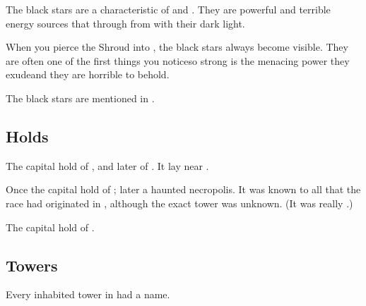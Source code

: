 The black stars are a characteristic of \Nyx{} and \Erebos. They are powerful and terrible energy sources that  through from \Erebos{} with their dark light. 

When you pierce the Shroud into \Nyx, the black stars always become visible. They are often one of the first things you notice\dash so strong is the menacing power they exude\dash and they are horrible to behold. 

The black stars are mentioned in \emph{}. 








\subsection{Holds}





\begin{gloss}



  \gitem{\Cathedon}
  The capital hold of , and later of \CiriathSepher. 
  It lay near \Hyardes. 



  \gitem[Hyardes]{\Hyardes}
  Once the capital hold of ; later a haunted necropolis.
  It was known to all \resphain that the \resphan race had originated in \Tarcharos, although the exact tower was unknown. 
  (It was really .)



  \gitem{\Surammas}
  The capital hold of \Mystraacht. 



\end{gloss}








\subsection{Towers}
Every inhabited tower in \Nyx had a name. 





